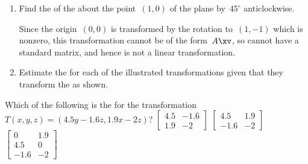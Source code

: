 \begin{example}
\begin{enumerate}[ref=\ref{eg:stmatlt}(\alph*)]
\item Find the  of the  about the point~\((1,0)\) of the plane by~\(45^\circ\) anticlockwise.
\begin{solution} 
Since the origin~\((0,0)\) is transformed by the rotation to~\((1,-1)\) which is nonzero, this transformation cannot be of the form~\(A\xv\), so cannot have a standard matrix, and hence is not a linear transformation.
\end{solution}


\item Estimate the  for each of the illustrated transformations given that they transform the  as shown.
\def\unithousesize{footnotesize,grid}
\newcommand{\TwoDmat}[4]{\TwoD{#1}{#2}{#3}{#4}
\\\emph{Solution:} Here \(T(1,0)\approx(#1,#3)\) and \(T(0,1)\approx(#2,#4)\) so the approximate standard matrix is \(\begin{bmat} #1&#2\\#3&#4 \end{bmat}\).}

\end{enumerate}
\end{example}




\begin{activity}
Which of the following is the  for the transformation \(T(x,y,z)=(4.5y-1.6z,1.9x-2z)\)?
{\(\begin{bmatrix} 4.5&-1.6\\1.9&-2 \end{bmatrix}\)}
{\(\begin{bmatrix} 4.5&1.9\\-1.6&-2 \end{bmatrix}\)}
{\(\begin{bmatrix} 0&1.9\\4.5&0\\-1.6&-2 \end{bmatrix}\)}
\end{activity}




